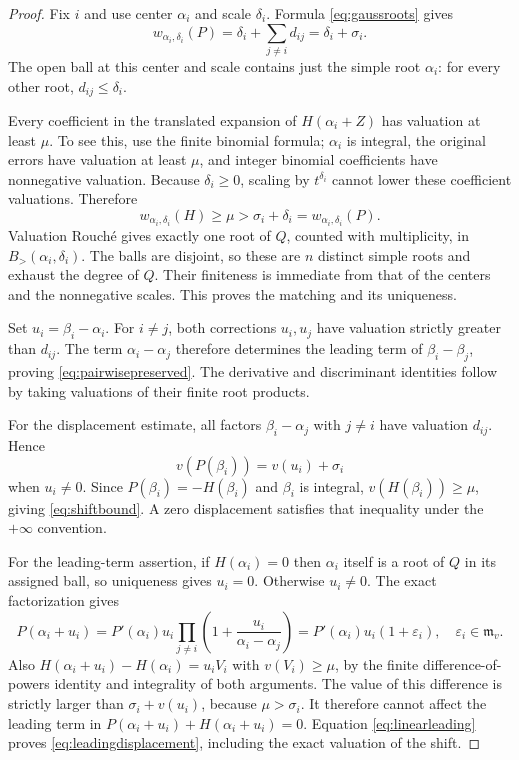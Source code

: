 \documentclass[11pt,letterpaper]{article}
\numberwithin{equation}{section}
\theoremstyle{definition}
\theoremstyle{remark}
\newcommand{\mv}{\mathfrak m_v}
\newcommand{\Bgt}[2]{B_{>}(#1,#2)}
\begin{document}
\begin{proof}
Fix $i$ and use center $\alpha_i$ and scale $\delta_i$.
Formula \eqref{eq:gaussroots} gives
\begin{equation}\label{eq:rootweight}
 w_{\alpha_i,\delta_i}(P)=\delta_i+\sum_{j\ne i}d_{ij}
 =\delta_i+\sigma_i.
\end{equation}
The open ball at this center and scale contains just the simple root
$\alpha_i$: for every other root, $d_{ij}\le\delta_i$.

Every coefficient in the translated expansion of $H(\alpha_i+Z)$ has
valuation at least $\mu$. To see this, use the finite binomial formula;
$\alpha_i$ is integral, the original errors have valuation at least
$\mu$, and integer binomial coefficients have nonnegative valuation.
Because $\delta_i\ge0$, scaling by $t^{\delta_i}$ cannot lower these
coefficient valuations. Therefore
\[
 w_{\alpha_i,\delta_i}(H)\ge\mu>
             \sigma_i+\delta_i=w_{\alpha_i,\delta_i}(P).
\]
Valuation Rouch\'e gives exactly one root of $Q$, counted with multiplicity,
in $\Bgt{\alpha_i}{\delta_i}$. The balls are disjoint, so these are $n$
distinct simple roots and exhaust the degree of $Q$. Their finiteness is
immediate from that of the centers and the nonnegative scales.
This proves the matching and its uniqueness.

Set $u_i=\beta_i-\alpha_i$. For $i\ne j$, both corrections $u_i,u_j$
have valuation strictly greater than $d_{ij}$. The term
$\alpha_i-\alpha_j$ therefore determines the leading term of
$\beta_i-\beta_j$, proving \eqref{eq:pairwisepreserved}. The derivative
and discriminant identities follow by taking valuations of their finite
root products.

For the displacement estimate, all factors
$\beta_i-\alpha_j$ with $j\ne i$ have valuation $d_{ij}$. Hence
\[
 v(P(\beta_i))=v(u_i)+\sigma_i
\]
when $u_i\ne0$. Since $P(\beta_i)=-H(\beta_i)$ and $\beta_i$ is integral,
$v(H(\beta_i))\ge\mu$, giving \eqref{eq:shiftbound}. A zero displacement
satisfies that inequality under the $+\infty$ convention.

For the leading-term assertion, if $H(\alpha_i)=0$ then $\alpha_i$ itself
is a root of $Q$ in its assigned ball, so uniqueness gives $u_i=0$.
Otherwise $u_i\ne0$. The exact factorization gives
\begin{equation}\label{eq:linearleading}
 P(\alpha_i+u_i)=P'(\alpha_i)u_i
             \prod_{j\ne i}\left(1+\frac{u_i}{\alpha_i-\alpha_j}\right)
 =P'(\alpha_i)u_i(1+\varepsilon_i),
 \quad\varepsilon_i\in\mv.
\end{equation}
Also $H(\alpha_i+u_i)-H(\alpha_i)=u_i V_i$ with $v(V_i)\ge\mu$, by the
finite difference-of-powers identity and integrality of both arguments.
The value of this difference is strictly larger than
$\sigma_i+v(u_i)$, because $\mu>\sigma_i$. It therefore cannot affect
the leading term in
$P(\alpha_i+u_i)+H(\alpha_i+u_i)=0$. Equation
\eqref{eq:linearleading} proves \eqref{eq:leadingdisplacement}, including
the exact valuation of the shift.
\end{proof}
\end{document}

